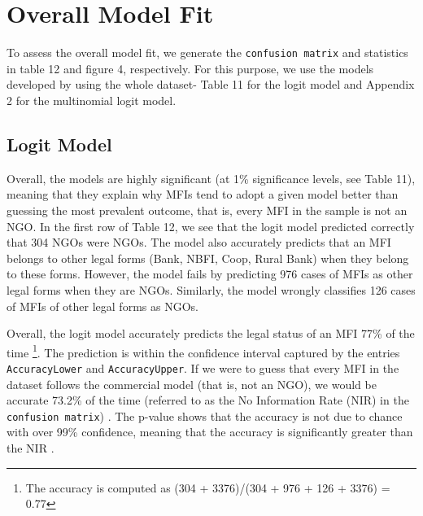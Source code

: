 \documentclass[a4paper,nobind]{templates/ociamthesis}
\begin{document}
\hypertarget{overall-model-fit}{%
\section{Overall Model Fit}\label{overall-model-fit}}

To assess the overall model fit, we generate the \texttt{confusion\ matrix} and statistics in table 12 and figure 4, respectively. For this purpose, we use the models developed by using the whole dataset- Table 11 for the logit model and Appendix 2 for the multinomial logit model.

\hypertarget{logit-model}{%
\subsection{Logit Model}\label{logit-model}}

Overall, the models are highly significant (at 1\% significance levels, see Table 11), meaning that they explain why MFIs tend to adopt a given model better than guessing the most prevalent outcome, that is, every MFI in the sample is not an NGO. In the first row of Table 12, we see that the logit model predicted correctly that 304 NGOs were NGOs. The model also accurately predicts that an MFI belongs to other legal forms (Bank, NBFI, Coop, Rural Bank) when they belong to these forms. However, the model fails by predicting 976 cases of MFIs as other legal forms when they are NGOs. Similarly, the model wrongly classifies 126 cases of MFIs of other legal forms as NGOs.

Overall, the logit model accurately predicts the legal status of an MFI 77\% of the time \footnote{The accuracy is computed as (304 + 3376)/(304 + 976 + 126 + 3376) = 0.77}. The prediction is within the confidence interval captured by the entries \texttt{AccuracyLower} and \texttt{AccuracyUpper}. If we were to guess that every MFI in the dataset follows the commercial model (that is, not an NGO), we would be accurate 73.2\% of the time (referred to as the No Information Rate (NIR) in the \texttt{confusion\ matrix}) \autocite{cavalin2018confusion}. The p-value shows that the accuracy is not due to chance with over 99\% confidence, meaning that the accuracy is significantly greater than the NIR \autocite{kleinbaum2002logistic}.
\end{document}
